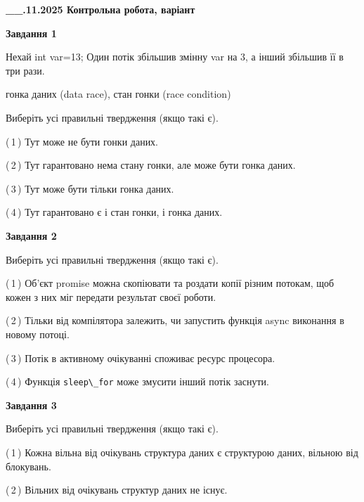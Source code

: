 \documentclass[12pt, ukrainian]{article}
\def\code#1{\Verb!#1!}
\begin{document}
\begin {large}

\textbf{\_\_.11.2025 Контрольна робота, варіант  }\par


{

\begin{center}
\textbf{Завдання 1}
\end{center}
Нехай int var=13; Один потік збільшив змінну var на 3, а інший збільшив її в три рази.

гонка даних (data race), стан гонки (race condition)

Виберіть усі правильні твердження (якщо такі є).\par
\vspace{2mm}
(\,1\,) Тут може не бути гонки даних.%

(\,2\,) Тут гарантовано нема стану гонки, але може бути гонка даних.%

(\,3\,) Тут може бути тільки гонка даних.%

(\,4\,) Тут гарантовано є і стан гонки, і гонка даних.%



\begin{center}
\textbf{Завдання 2}
\end{center}
Виберіть усі правильні твердження (якщо такі є).\par
\vspace{2mm}

(\,1\,) Об’єкт promise можна скопіювати та роздати копії різним потокам, щоб кожен з них міг передати результат своєї роботи.%

(\,2\,) Тільки від компілятора залежить, чи запустить функція async виконання в новому потоці.%

(\,3\,) Потік в активному очікуванні споживає ресурс процесора.%

(\,4\,) Функція \code{sleep\_for} може змусити інший потік заснути.%



\begin{center}
\textbf{Завдання 3}
\end{center}
Виберіть усі правильні твердження (якщо такі є).\par
\vspace{2mm}

(\,1\,) Кожна вільна від очікувань структура даних є структурою даних, вільною від блокувань.%

(\,2\,) Вільних від очікувань структур даних не існує.%

}
\end{large}
\end{document}
